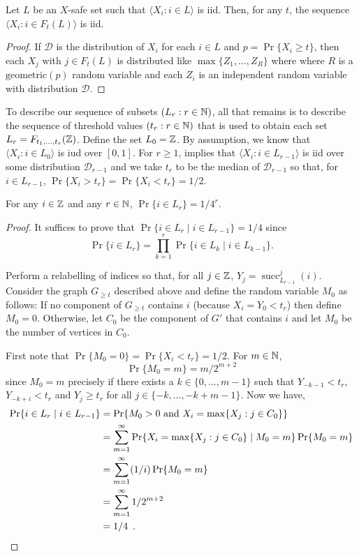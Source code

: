 \documentclass{patmorin}
\DeclareMathOperator{\cw}{succ}
\begin{document}
\begin{lem}
   Let $L$ be an $X$-safe set such that $\langle X_i:i\in L\rangle$ is iid.  Then, for any $t$, the sequence $\langle X_i: i\in F_t(L)\rangle$ is iid.
\end{lem}

\begin{proof}
  If $\mathcal{D}$ is the distribution of $X_i$ for each $i\in
  L$ and $p=\Pr\{X_i\ge t\}$, then each $X_j$ with $j\in F_t(L)$
  is distributed like $\max\{Z_1,\ldots,Z_R\}$ where where $R$ is a
  $\mathrm{geometric}(p)$ random variable and each $Z_i$ is an independent
  random variable with distribution $\mathcal{D}$.
\end{proof}

To describe our sequence of subsets $(L_r: r\in\mathbb{N})$, all that remains
is to describe the sequence of threshold values $(t_r:r\in\mathbb{N})$ that is
used to obtain each set $L_r = F_{t_1,\ldots,t_r}(\mathbb{Z})$.  Define the
set $L_0=\mathbb{Z}$.  By assumption, we know that $\langle X_i:i\in L_0\rangle$ is iud
over $[0,1]$.  For $r\ge 1$,  implies that $\langle X_i:i\in
L_{r-1}\rangle$ is iid over some distribution $\mathcal{D}_{r-1}$ and we take
$t_r$ to be the median of $\mathcal{D}_{r-1}$ so that, for $i\in L_{r-1}$,
$\Pr\{X_i > t_r\}=\Pr\{X_i < t_r\} = 1/2$.

\begin{lem}
   For any $i\in\mathbb{Z}$ and any $r\in\mathbb{N}$, $\Pr\{i\in L_r\} = 1/4^r$.
\end{lem}

\begin{proof}
   It suffices to prove that $\Pr\{i\in L_r \mid i\in L_{r-1}\} = 1/4$
   since \[ \Pr\{i\in L_r\} = \prod_{k=1}^r \Pr\{i\in L_k\mid i\in L_{k-1}\} .\]

   Perform a relabelling of indices so that, for all $j\in\mathbb{Z}$,
   $Y_j=\cw^j_{L_{r-1}}(i)$. Consider the graph $G_{\ge t}$ described
   above and define the random variable $M_0$ as follows:  If no component
   of $G_{\ge t}$ contains $i$ (because $X_i=Y_0<t_r$) then define $M_0=0$.
   Otherwise, let $C_0$ be the component of $G'$ that contains $i$
   and let $M_0$ be the number of vertices in $C_0$.

   First note that $\Pr\{M_0=0\}=\Pr\{X_i<t_r\}=1/2$.
   For $m \in \mathbb{N}$, 
   \[
       \Pr\{M_0=m\} = m/2^{m+2}
   \]
   since $M_0=m$ precisely if there exists a $k\in\{0,\ldots,m-1\}$
   such that $Y_{-k-1}< t_r$, $Y_{-k+i}<t_r$ and $Y_j \ge t_r$ for all
   $j\in\{-k,\ldots,-k+m-1\}$.  Now we have,
   \begin{align*}
      \Pr\{i\in L_r\mid i\in L_{r-1}\} 
          & = \Pr\{\mbox{$M_0>0$ and $X_i=\max\{X_j:j\in C_0\}$}\} \\
          & = \sum_{m=1}^\infty \Pr\{X_i=\max\{X_j:j\in C_0\}\mid M_0=m\}\Pr\{M_0=m\} \\ 
          & = \sum_{m=1}^\infty (1/i)\Pr\{M_0=m\} \\
          & = \sum_{m=1}^\infty 1/2^{m+2} \\
          & = 1/4 \enspace . \qedhere
   \end{align*}
\end{proof}
\end{document}
